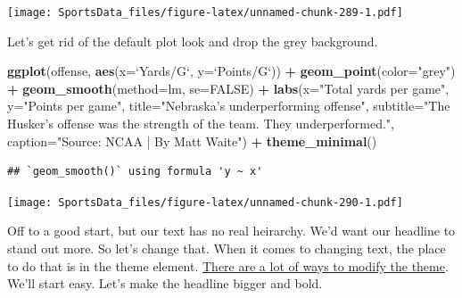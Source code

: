 \documentclass[
]{book}
\newenvironment{Shaded}{\begin{snugshade}}{\end{snugshade}}
\newcommand{\DataTypeTok}[1]{\textcolor[rgb]{0.13,0.29,0.53}{#1}}
\newcommand{\KeywordTok}[1]{\textcolor[rgb]{0.13,0.29,0.53}{\textbf{#1}}}
\newcommand{\NormalTok}[1]{#1}
\newcommand{\OperatorTok}[1]{\textcolor[rgb]{0.81,0.36,0.00}{\textbf{#1}}}
\newcommand{\OtherTok}[1]{\textcolor[rgb]{0.56,0.35,0.01}{#1}}
\newcommand{\StringTok}[1]{\textcolor[rgb]{0.31,0.60,0.02}{#1}}
\begin{document}
\texttt{[image: SportsData\_files/figure-latex/unnamed-chunk-289-1.pdf]}

Let's get rid of the default plot look and drop the grey background.

\begin{Shaded}
\begin{Highlighting}[]
\KeywordTok{ggplot}\NormalTok{(offense, }\KeywordTok{aes}\NormalTok{(}\DataTypeTok{x=}\StringTok{`}\DataTypeTok{Yards/G}\StringTok{`}\NormalTok{, }\DataTypeTok{y=}\StringTok{`}\DataTypeTok{Points/G}\StringTok{`}\NormalTok{)) }\OperatorTok{+}\StringTok{ }
\StringTok{  }\KeywordTok{geom_point}\NormalTok{(}\DataTypeTok{color=}\StringTok{"grey"}\NormalTok{) }\OperatorTok{+}\StringTok{ }\KeywordTok{geom_smooth}\NormalTok{(}\DataTypeTok{method=}\NormalTok{lm, }\DataTypeTok{se=}\OtherTok{FALSE}\NormalTok{) }\OperatorTok{+}\StringTok{ }
\StringTok{  }\KeywordTok{labs}\NormalTok{(}\DataTypeTok{x=}\StringTok{"Total yards per game"}\NormalTok{, }\DataTypeTok{y=}\StringTok{"Points per game"}\NormalTok{, }\DataTypeTok{title=}\StringTok{"Nebraska's underperforming offense"}\NormalTok{, }\DataTypeTok{subtitle=}\StringTok{"The Husker's offense was the strength of the team. They underperformed."}\NormalTok{, }\DataTypeTok{caption=}\StringTok{"Source: NCAA | By Matt Waite"}\NormalTok{) }\OperatorTok{+}\StringTok{ }
\StringTok{  }\KeywordTok{theme_minimal}\NormalTok{()}
\end{Highlighting}
\end{Shaded}

\begin{verbatim}
## `geom_smooth()` using formula 'y ~ x'
\end{verbatim}

\texttt{[image: SportsData\_files/figure-latex/unnamed-chunk-290-1.pdf]}

Off to a good start, but our text has no real heirarchy. We'd want our headline to stand out more. So let's change that. When it comes to changing text, the place to do that is in the theme element. \href{http://ggplot2.tidyverse.org/reference/theme.html}{There are a lot of ways to modify the theme}. We'll start easy. Let's make the headline bigger and bold.
\end{document}
